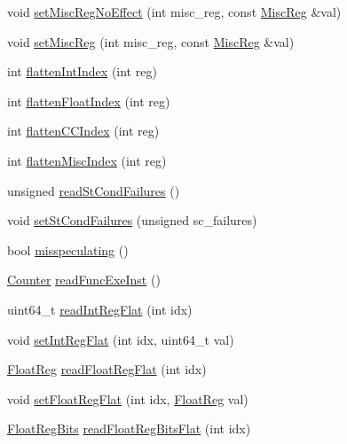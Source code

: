 \begin{DoxyCompactItemize}
\item 
void \hyperlink{classCheckerThreadContext_a763517aaea2f3decbc1ef9d064216b6f}{setMiscRegNoEffect} (int misc\_\-reg, const \hyperlink{classThreadContext_aaf5f073a387db0556d1db4bcc45428bc}{MiscReg} \&val)
\item 
void \hyperlink{classCheckerThreadContext_a1877dde4f3eb17a8b7d33ea40176c148}{setMiscReg} (int misc\_\-reg, const \hyperlink{classThreadContext_aaf5f073a387db0556d1db4bcc45428bc}{MiscReg} \&val)
\item 
int \hyperlink{classCheckerThreadContext_aa529f2d70520c578e3e29b3bf1a66312}{flattenIntIndex} (int reg)
\item 
int \hyperlink{classCheckerThreadContext_ab9ea3f8f1a21df875c7273c7377dfac1}{flattenFloatIndex} (int reg)
\item 
int \hyperlink{classCheckerThreadContext_ac33d74353e36a595ec48962cd0446320}{flattenCCIndex} (int reg)
\item 
int \hyperlink{classCheckerThreadContext_a5adc7d32f3a8bd75c5dc0a62d95564fd}{flattenMiscIndex} (int reg)
\item 
unsigned \hyperlink{classCheckerThreadContext_a25b995a791e41965e088d8bf3f2bf859}{readStCondFailures} ()
\item 
void \hyperlink{classCheckerThreadContext_abbe779fa43c72cd485ddb736ab17ff61}{setStCondFailures} (unsigned sc\_\-failures)
\item 
bool \hyperlink{classCheckerThreadContext_a99768639c728ee835cce54b8b42b3d8f}{misspeculating} ()
\item 
\hyperlink{base_2types_8hh_ae1475755791765b8e6f6a8bb091e273e}{Counter} \hyperlink{classCheckerThreadContext_a2b0bef6e1b1ac24e9322fbd09a511d11}{readFuncExeInst} ()
\item 
uint64\_\-t \hyperlink{classCheckerThreadContext_aed7abd4afcb954f8612e4ef1fe73317a}{readIntRegFlat} (int idx)
\item 
void \hyperlink{classCheckerThreadContext_ae3b8c9c2c1ae95767f0703357957a3f8}{setIntRegFlat} (int idx, uint64\_\-t val)
\item 
\hyperlink{classThreadContext_a75484259f1855aabc8d74c6eb1cfe186}{FloatReg} \hyperlink{classCheckerThreadContext_aaa32dc9f4a8719a465c267fed47cbdc6}{readFloatRegFlat} (int idx)
\item 
void \hyperlink{classCheckerThreadContext_a71ec23ca2c029120932e5af4babc0da1}{setFloatRegFlat} (int idx, \hyperlink{classThreadContext_a75484259f1855aabc8d74c6eb1cfe186}{FloatReg} val)
\item 
\hyperlink{classThreadContext_aab5eeae86499f9bfe15ef79360eccc64}{FloatRegBits} \hyperlink{classCheckerThreadContext_a2fa29585c9694c9bffcce2a63f871759}{readFloatRegBitsFlat} (int idx)

\end{DoxyCompactItemize}
